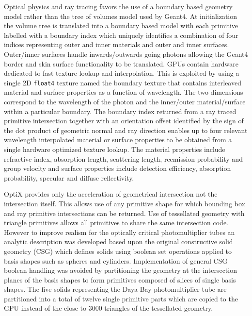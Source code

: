 \documentclass[a4paper]{jpconf}
\begin{document}
Optical physics and ray tracing favors the use of a boundary based geometry model 
rather than the tree of volumes model used by Geant4. 
At initialization the volume tree is translated into a boundary based model 
with each primitive labelled with a boundary index which uniquely identifies 
a combination of four indices representing outer and inner materials and outer and inner surfaces.
Outer/inner surfaces handle inwards/outwards going photons allowing the Geant4 border and skin 
surface functionality to be translated.
GPUs contain hardware dedicated to fast texture lookup and interpolation. 
This is exploited by using a single 2D {\tt float4} texture named the boundary texture 
that contains interleaved material and surface properties as a function of wavelength. 
The two dimensions correspond to the wavelength of the photon and the inner/outer material/surface 
within a particular boundary. 
The boundary index returned from a ray traced primitive intersection together with 
an orientation offset identified by the sign of the dot product of geometric normal and ray direction 
enables up to four relevant wavelength interpolated material or surface properties to be 
obtained from a single hardware optimized texture lookup.
The material properties include refractive index, absorption length, scattering length, reemission probability and  group velocity
and surface properties include detection efficiency, absorption probability, specular and diffuse reflectivity.

OptiX provides only the acceleration of geometrical intersection not the intersection itself. 
This allows use of any primitive shape for which bounding box and ray primitive intersections can be returned.
Use of tessellated geometry with triangle primitives allows all primitives to share the same intersection code. 
However to improve realism for the optically critical photomultiplier tubes 
an analytic description was developed based upon the original constructive solid geometry (CSG)
which defines solids using boolean set operations applied to basis shapes such as spheres and cylinders.
Implementation of general CSG boolean handling was avoided by partitioning the geometry at 
the intersection planes of the basis shapes to form primitives 
composed of slices of single basis shapes. The five solids representing the Daya Bay 
photomultiplier tube are partitioned into a total of twelve single primitive parts 
which are copied to the GPU instead of the close to 3000 triangles of the tessellated geometry. 
\end{document}
